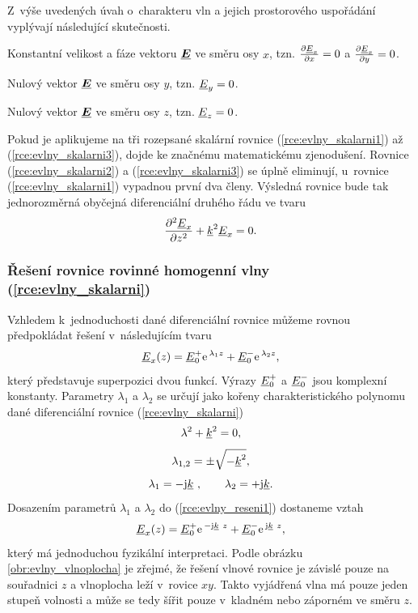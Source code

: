Z~výše uvedených úvah o~charakteru vln a jejich prostorového uspořádání vyplývají následující skutečnosti.
\begin{itemize*}
\item Konstantní velikost a fáze vektoru $\mbox{\underline{\boldmath$E$}}$ ve směru osy $x$, tzn. $\frac{\partial  {\underline{E}}_{x}}{\partial x}=0$ a $\frac{\partial {\underline{E}}_{x}}{\partial y}=0$.
\item Nulový vektor $\mbox{\underline{\boldmath$E$}}$ ve směru osy $y$, tzn. $ {\underline{E}}_{y} = 0$.
\item Nulový vektor $\mbox{\underline{\boldmath$E$}}$ ve směru osy $z$, tzn. $ {\underline{E}}_{z} = 0$.
\end{itemize*}
Pokud je aplikujeme na tři rozepsané skalární rovnice (\ref{rce:evlny_skalarni1}) až (\ref{rce:evlny_skalarni3}), dojde ke značnému matematickému zjenodušení. Rovnice (\ref{rce:evlny_skalarni2}) a (\ref{rce:evlny_skalarni3}) se úplně eliminují, u~rovnice (\ref{rce:evlny_skalarni1}) vypadnou první dva členy. Výsledná rovnice bude tak jednorozměrná obyčejná diferenciální druhého řádu ve tvaru
\begin{equation}
	\frac{\partial ^{2} {\underline{E}}_{x}}{\partial z^{2}} + {\underline{k}}^{2} {\underline{E}}_{x} = 0.
	\label{rce:evlny_skalarni}	
\end{equation}

\subsubsection*{Řešení rovnice rovinné homogenní vlny (\ref{rce:evlny_skalarni})}
Vzhledem k~jednoduchosti dané diferenciální rovnice můžeme rovnou předpokládat řešení v~následujícím tvaru
\begin{equation}
	{\underline{E}}_{x}(z) = {\underline{E}}_{0}^{+}\mathrm{e\,}^{\lambda_{1}z} +{\underline{E}}_{0}^{-}\mathrm{e\,}^{\lambda_{2}z},
	\label{rce:evlny_reseni1}	
\end{equation}
který představuje superpozici dvou funkcí. Výrazy ${\underline{E}}_{0}^{+}$ a ${\underline{E}}_{0}^{-}$ jsou komplexní konstanty. Parametry $\lambda_{1}$ a $\lambda_{2}$ se určují jako kořeny charakteristického polynomu dané diferenciální rovnice (\ref{rce:evlny_skalarni})
\begin{displaymath}
	\lambda^{2} + {\underline{k}}^{2}= 0,
\end{displaymath}
\begin{displaymath}
	\lambda_{1,2} = \pm \sqrt{-{\underline{k}}^{2}},
\end{displaymath}
\begin{displaymath}
	\lambda_{1} = -\mathrm{j}{\underline{k}}~,\qquad \lambda_{2} = +\mathrm{j}{\underline{k}}.
\end{displaymath}
Dosazením parametrů $\lambda_{1}$ a $\lambda_{2}$ do (\ref{rce:evlny_reseni1}) dostaneme vztah 
\begin{equation}
	{\underline{E}}_{x}(z) = {\underline{E}}_{0}^{+}\mathrm{e\,}^{-\mathrm{j}{\underline{k}}~z} + {\underline{E}}_{0}^{-}\mathrm{e\,}^{\mathrm{j}{\underline{k}}~z},
	\label{rce:evlny_reseni2}	
\end{equation}
který má jednoduchou fyzikální interpretaci. Podle obrázku \ref{obr:evlny_vlnoplocha} je zřejmé, že řešení vlnové rovnice je závislé pouze na souřadnici $z$ a vlnoplocha leží v~rovice $xy$. Takto vyjádřená vlna má pouze jeden stupeň volnosti a může se tedy šířit pouze v~kladném nebo záporném ve směru $z$.

